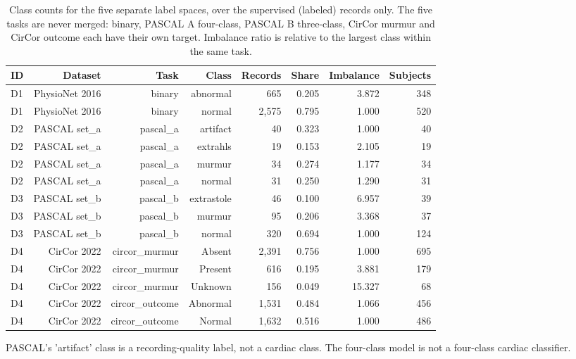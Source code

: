 \begin{table}[htbp]
  \centering
  \caption{Class counts for the five separate label spaces, over the supervised (labeled) records only. The five tasks are never merged: binary, PASCAL A four-class, PASCAL B three-class, CirCor murmur and CirCor outcome each have their own target. Imbalance ratio is relative to the largest class within the same task.}
  \label{tab:t02}
  \begin{tabular}{lrrrrrrr}
    \toprule
    ID & Dataset & Task & Class & Records & Share & Imbalance & Subjects \\
    \midrule
    D1 & PhysioNet 2016 & binary & abnormal & 665 & 0.205 & 3.872 & 348 \\
    D1 & PhysioNet 2016 & binary & normal & 2,575 & 0.795 & 1.000 & 520 \\
    D2 & PASCAL set\_a & pascal\_a & artifact & 40 & 0.323 & 1.000 & 40 \\
    D2 & PASCAL set\_a & pascal\_a & extrahls & 19 & 0.153 & 2.105 & 19 \\
    D2 & PASCAL set\_a & pascal\_a & murmur & 34 & 0.274 & 1.177 & 34 \\
    D2 & PASCAL set\_a & pascal\_a & normal & 31 & 0.250 & 1.290 & 31 \\
    D3 & PASCAL set\_b & pascal\_b & extrastole & 46 & 0.100 & 6.957 & 39 \\
    D3 & PASCAL set\_b & pascal\_b & murmur & 95 & 0.206 & 3.368 & 37 \\
    D3 & PASCAL set\_b & pascal\_b & normal & 320 & 0.694 & 1.000 & 124 \\
    D4 & CirCor 2022 & circor\_murmur & Absent & 2,391 & 0.756 & 1.000 & 695 \\
    D4 & CirCor 2022 & circor\_murmur & Present & 616 & 0.195 & 3.881 & 179 \\
    D4 & CirCor 2022 & circor\_murmur & Unknown & 156 & 0.049 & 15.327 & 68 \\
    D4 & CirCor 2022 & circor\_outcome & Abnormal & 1,531 & 0.484 & 1.066 & 456 \\
    D4 & CirCor 2022 & circor\_outcome & Normal & 1,632 & 0.516 & 1.000 & 486 \\
    \bottomrule
  \end{tabular}
  \par\footnotesize PASCAL's 'artifact' class is a recording-quality label, not a cardiac class. The four-class model is not a four-class cardiac classifier.
\end{table}
